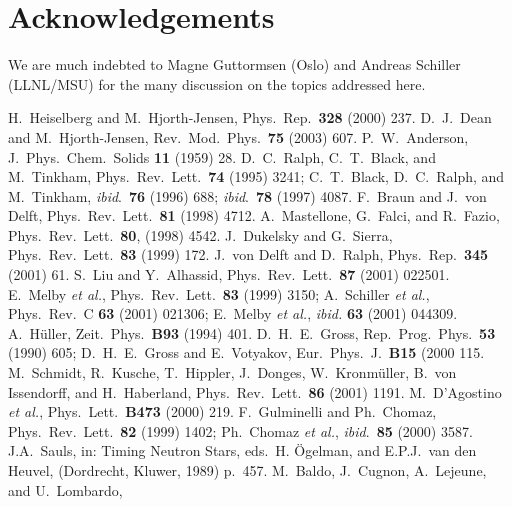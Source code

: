 \documentclass{elsart}
\begin{document}
\section*{Acknowledgements}
We are much indebted to 
Magne Guttormsen (Oslo)
and Andreas Schiller (LLNL/MSU) 
for the many discussion on the topics addressed here.


\begin{thebibliography}{99}
 H.~Heiselberg and M.~Hjorth-Jensen, 
Phys.~Rep.~{\bf 328} (2000) 237.
 D.~J.~Dean and M.~Hjorth-Jensen, 
Rev.~Mod.~Phys.~{\bf 75} (2003) 607.
 P.~W.~Anderson, J.~Phys.~Chem.~Solids {\bf 11} (1959) 28.
 D.~C.~Ralph, C.~T.~Black, and M.~Tinkham, 
                      Phys.~Rev.~Lett.~{\bf 74} (1995) 3241; C.~T.~Black, D.~C.~Ralph, 
                      and M.~Tinkham, {\em ibid}.~{\bf 76} (1996) 688; 
                      {\em ibid}.~{\bf 78} (1997) 4087. 
 F.~Braun and J.~von Delft, 
Phys.~Rev.~Lett.~{\bf 81} (1998) 4712.
 A.~Mastellone, G.~Falci, and R.~Fazio, 
                       Phys.~Rev.~Lett.~{\bf 80}, (1998) 4542.
 J.~Dukelsky and G.~Sierra, 
Phys.~Rev.~Lett.~{\bf 83} (1999) 172.
 J.~von Delft and D.~Ralph, Phys.~Rep.~{\bf 345} (2001) 61.
 S.~Liu and Y.~Alhassid, 
                       Phys.~Rev.~Lett.~{\bf 87} (2001) 022501.
E.~Melby {\em et al.},
                     Phys.~Rev.~Lett.~{\bf 83} (1999) 3150; 
                     A.~Schiller {\em et al.}, 
                     Phys.\ Rev.~C {\bf 63} (2001) 021306; 
                     E.~Melby {\em et al.}, {\em ibid.} {\bf 63}
                      (2001) 044309.
 A.~H\"{u}ller, Zeit.~Phys.~{\bf B93} (1994) 401.
 D.~H.~E.~Gross, Rep.~Prog.~Phys.~{\bf 53} (1990) 605;   D.~H.~E.~Gross and E.~Votyakov, Eur.~Phys.~J.~{\bf B15} (2000 115.
 M.~Schmidt, R.~Kusche, T.~Hippler, J.~Donges, W.~Kronm\"uller, 
                    B.~von Issendorff, and H.~Haberland,   
                    Phys.~Rev.~Lett.~{\bf 86} (2001) 1191.
M.~D'Agostino {\em et al.}, 
Phys.~Lett.~{\bf B473} (2000) 219.
 F.~Gulminelli and Ph.~Chomaz, Phys.~Rev.~Lett.~{\bf 82} (1999) 1402; 
               Ph.~Chomaz {\em et al.}, {\em ibid}.~{\bf 85} (2000) 3587. 
J.A.\ Sauls, in: Timing Neutron Stars, 
eds.\ H. \"{O}gelman, and E.P.J.\ van den Heuvel,   
(Dordrecht, Kluwer, 1989) p.\ 457. 
  M.\ Baldo, J.\ Cugnon, A.\ Lejeune, and U.\ Lombardo,

\end{thebibliography}
\end{document}
